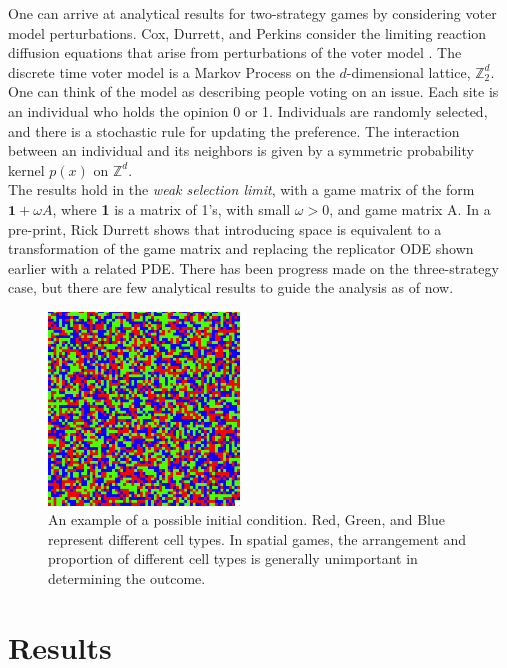 \documentclass[12pt]{report}
\begin{document}
One can arrive at analytical results for two-strategy games by considering voter model perturbations. Cox, Durrett, and Perkins consider the limiting reaction diffusion equations that arise from perturbations of the voter model   \cite{Cox2011}. The discrete time voter model is a Markov Process on the $d$-dimensional lattice, $\mathbb{Z}_2^d$. One can think of the model as describing people voting on an issue. Each site is an individual who holds the opinion 0 or 1. Individuals are randomly selected, and there is a stochastic rule for updating the preference. The interaction between an individual and its neighbors is given by a symmetric probability  kernel $p(x)$ on $\mathbb{Z}^d$. \\

The results hold in the \textit{weak selection limit}, with a game matrix of the form $\textbf{1} + \omega A$, where \textbf{1} is a matrix of 1's, with small $\omega > 0$, and game matrix A. In a pre-print, Rick Durrett shows that introducing space is equivalent to a transformation of the game matrix and replacing the replicator ODE shown earlier with a related PDE. There has been progress made on the three-strategy case, but there are few analytical results to guide the analysis as of now.\\



\begin{figure}[t]
\caption{An example of a possible initial condition. Red, Green, and Blue represent different cell types. In spatial games, the arrangement and proportion of different cell types is generally unimportant in determining the outcome.}
\centering
\includegraphics[width = 2in]{Diagrams/General/even_random_mix}
\end{figure}

\chapter*{Results}
\end{document}
